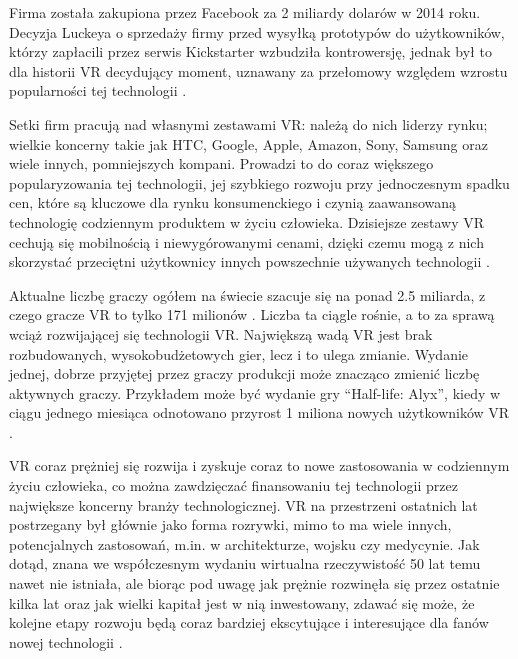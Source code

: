 Firma została zakupiona przez Facebook za 2 miliardy dolarów w 2014 roku. Decyzja Luckeya o sprzedaży firmy przed wysyłką prototypów do użytkowników, którzy zapłacili przez serwis Kickstarter wzbudziła kontrowersję, jednak był to dla historii VR decydujący moment, uznawany za przełomowy względem wzrostu popularności tej technologii \citep{virtualfor}.

Setki firm pracują nad własnymi zestawami VR: należą do nich liderzy rynku; wielkie koncerny takie jak HTC, Google, Apple, Amazon, Sony, Samsung oraz wiele innych, pomniejszych kompani. Prowadzi to do coraz większego popularyzowania tej technologii, jej szybkiego rozwoju przy jednoczesnym spadku cen, które są kluczowe dla rynku konsumenckiego i czynią  zaawansowaną technologię codziennym produktem w życiu człowieka. Dzisiejsze zestawy VR cechują się mobilnością i niewygórowanymi cenami, dzięki czemu mogą z nich skorzystać przeciętni użytkownicy innych powszechnie używanych technologii \citep{website:virtualspeech}.

Aktualne liczbę graczy ogółem na świecie szacuje się na ponad 2.5 miliarda, z czego gracze VR to tylko 171 milionów \citep{website:gameindustry, website:vrstats}. Liczba ta ciągle rośnie, a to za sprawą wciąż rozwijającej się technologii VR. Największą wadą VR jest brak rozbudowanych, wysokobudżetowych gier, lecz i to ulega zmianie. Wydanie jednej, dobrze przyjętej przez graczy produkcji może znacząco zmienić liczbę aktywnych graczy. Przykładem może być wydanie gry ``Half-life: Alyx'', kiedy w ciągu jednego miesiąca odnotowano przyrost 1 miliona nowych użytkowników VR \citep{website:alyx}.

VR coraz prężniej się rozwija i zyskuje coraz to nowe zastosowania w codziennym życiu człowieka, co można zawdzięczać finansowaniu tej technologii przez największe koncerny branży technologicznej. VR na przestrzeni ostatnich lat postrzegany był głównie jako forma rozrywki, mimo to ma wiele innych, potencjalnych zastosowań, m.in. w architekturze, wojsku czy medycynie. Jak dotąd, znana we współczesnym wydaniu wirtualna rzeczywistość 50 lat temu nawet nie istniała, ale biorąc pod uwagę jak prężnie rozwinęła się przez ostatnie kilka lat oraz jak wielki kapitał jest w nią inwestowany, zdawać się może, że kolejne etapy rozwoju będą coraz bardziej ekscytujące i interesujące dla fanów nowej technologii \citep{website:learng2, website:zastosowanievr}.

